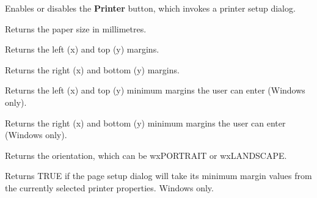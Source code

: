 
Enables or disables the {\bf Printer} button, which invokes a printer setup dialog.

\label{wxpagesetupdatagetpapersize}


Returns the paper size in millimetres.

\label{wxpagesetupdatagetmargintopleft}


Returns the left (x) and top (y) margins.

\label{wxpagesetupdatagetmarginbottomright}


Returns the right (x) and bottom (y) margins.

\label{wxpagesetupdatagetminmargintopleft}


Returns the left (x) and top (y) minimum margins the user can enter (Windows only).

\label{wxpagesetupdatagetminmarginbottomright}


Returns the right (x) and bottom (y) minimum margins the user can enter (Windows only).

\label{wxpagesetupdatagetorientation}


Returns the orientation, which can be wxPORTRAIT or wxLANDSCAPE.

\label{wxpagesetupdatagetdefaultminmargins}


Returns TRUE if the page setup dialog will take its minimum margin values from the currently
selected printer properties. Windows only.

\label{wxpagesetupdatagetenablemargins}

